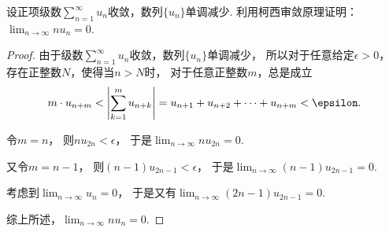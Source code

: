 \begin{example}
设正项级数\(\sum_{n=1}^\infty u_n\)收敛，数列\(\{u_n\}\)单调减少.
利用柯西审敛原理证明：\(\lim_{n\to\infty} n u_n = 0\).
\begin{proof}
由于级数\(\sum_{n=1}^\infty u_n\)收敛，数列\(\{u_n\}\)单调减少，
所以对于任意给定\(\epsilon>0\)，
存在正整数\(N\)，使得当\(n>N\)时，
对于任意正整数\(m\)，总是成立\[
	m \cdot u_{n+m}
	< \abs{\sum_{k=1}^m u_{n+k}}
	= u_{n+1} + u_{n+2} + \dotsb + u_{n+m}
	< \epsilon.
\]

令\(m=n\)，
则\(n u_{2n} < \epsilon\)，
于是\(\lim_{n\to\infty} n u_{2n} = 0\).

又令\(m=n-1\)，
则\((n-1) u_{2n-1} < \epsilon\)，
于是\(\lim_{n\to\infty} (n-1) u_{2n-1} = 0\).

考虑到\(\lim_{n\to\infty} u_n = 0\)，
于是又有\(\lim_{n\to\infty} (2n-1) u_{2n-1} = 0\).

综上所述，\(\lim_{n\to\infty} n u_n = 0\).
\end{proof}
\end{example}
